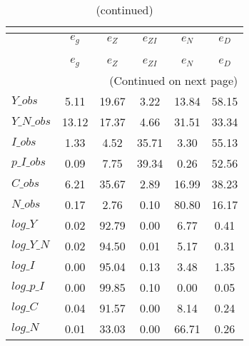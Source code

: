  
\begin{center}
\begin{longtable}{lccccc} 
\caption{VARIANCE DECOMPOSITION (in percent)}\\
 \label{Table:th_var_decomp_uncond}\\
\toprule 
$           $	 & 	 $       {e_g}$	 & 	 $       {e_Z}$	 & 	 $    {e_{ZI}}$	 & 	 $       {e_N}$	 & 	 $       {e_D}$\\
\midrule \endfirsthead 
\caption{(continued)}\\
 \toprule \\ 
$           $	 & 	 $       {e_g}$	 & 	 $       {e_Z}$	 & 	 $    {e_{ZI}}$	 & 	 $       {e_N}$	 & 	 $       {e_D}$\\
\midrule \endhead 
\midrule \multicolumn{6}{r}{(Continued on next page)} \\ \bottomrule \endfoot 
\bottomrule \endlastfoot 
$Y\_obs     $	 & 	        5.11	 & 	       19.67	 & 	        3.22	 & 	       13.84	 & 	       58.15 \\ 
$Y\_N\_obs  $	 & 	       13.12	 & 	       17.37	 & 	        4.66	 & 	       31.51	 & 	       33.34 \\ 
$I\_obs     $	 & 	        1.33	 & 	        4.52	 & 	       35.71	 & 	        3.30	 & 	       55.13 \\ 
$p\_I\_obs  $	 & 	        0.09	 & 	        7.75	 & 	       39.34	 & 	        0.26	 & 	       52.56 \\ 
$C\_obs     $	 & 	        6.21	 & 	       35.67	 & 	        2.89	 & 	       16.99	 & 	       38.23 \\ 
$N\_obs     $	 & 	        0.17	 & 	        2.76	 & 	        0.10	 & 	       80.80	 & 	       16.17 \\ 
$log\_Y     $	 & 	        0.02	 & 	       92.79	 & 	        0.00	 & 	        6.77	 & 	        0.41 \\ 
$log\_Y\_N  $	 & 	        0.02	 & 	       94.50	 & 	        0.01	 & 	        5.17	 & 	        0.31 \\ 
$log\_I     $	 & 	        0.00	 & 	       95.04	 & 	        0.13	 & 	        3.48	 & 	        1.35 \\ 
$log\_p\_I  $	 & 	        0.00	 & 	       99.85	 & 	        0.10	 & 	        0.00	 & 	        0.05 \\ 
$log\_C     $	 & 	        0.04	 & 	       91.57	 & 	        0.00	 & 	        8.14	 & 	        0.24 \\ 
$log\_N     $	 & 	        0.01	 & 	       33.03	 & 	        0.00	 & 	       66.71	 & 	        0.26 \\ 
\end{longtable}
 \end{center}
